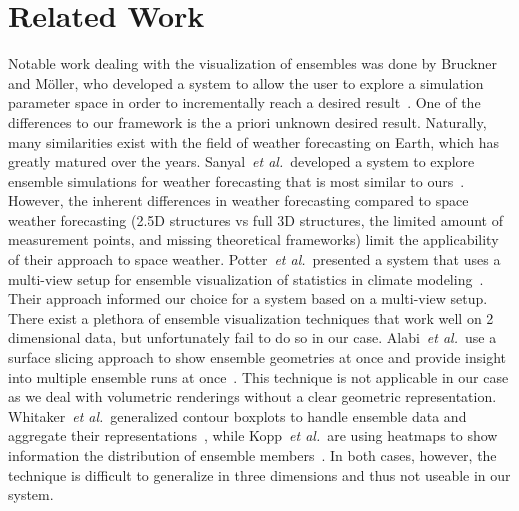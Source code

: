 \documentclass[journal]{vgtc}                %
\def\etal{\textit{et al.}}
\def\etal{\textit{et al.}}
\begin{document}
\section{Related Work}
 Notable work dealing with the visualization of ensembles was done by Bruckner and M\"oller, who developed a system to allow the user to explore a simulation parameter space in order to incrementally reach a desired result~\cite{bruckner2010result}. One of the differences to our framework is the a priori unknown desired result. Naturally, many similarities exist with the field of weather forecasting on Earth, which has greatly matured over the years. Sanyal~\etal\ developed a system to explore ensemble simulations for weather forecasting that is most similar to ours~\cite{sanyal2010noodles}. However, the inherent differences in weather forecasting compared to space weather forecasting (2.5D structures vs full 3D structures, the limited amount of measurement points, and missing theoretical frameworks) limit the applicability of their approach to space weather. Potter~\etal\ presented a system that uses a multi-view setup for ensemble visualization of statistics in climate modeling~\cite{potter2009ensemble}. Their approach informed our choice for a system based on a multi-view setup. There exist a plethora of ensemble visualization techniques that work well on 2 dimensional data, but unfortunately fail to do so in our case. Alabi~\etal\ use a surface slicing approach to show ensemble geometries at once and provide insight into multiple ensemble runs at once~\cite{alabi2012comparative}. This technique is not applicable in our case as we deal with volumetric renderings without a clear geometric representation. Whitaker~\etal\ generalized contour boxplots to handle ensemble data and aggregate their representations~\cite{whitaker2013contour}, while Kopp~\etal\ are using heatmaps to show information the distribution of ensemble members~\cite{kopp2014decision}. In both cases, however, the technique is difficult to generalize in three dimensions and thus not useable in our system.
\end{document}
